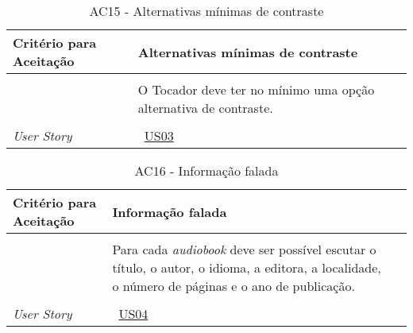 \begin{apendicesenv}
\begin{table}[ht]
\begin{center}
\begin{tabularx}{\textwidth}{|lX|l|}
\end{tabularx}
\end{center}
\label{tab:us01a14}
\end{table}


\begin{table}[ht]
\centering
\caption{AC15 - Alternativas mínimas de contraste}
\vspace{0.1cm}
\begin{center}
\begin{tabularx}{\textwidth}{|lX|l|}

\hline
\textbf{Critério para Aceitação} & Alternativas mínimas de contraste \\
\hline
 & \\
 & O Tocador deve ter no mínimo uma opção alternativa de contraste. \\
 & \\
\hline
\textit{User Story} & ~\hyperref[tab:us03]{US03} \\
\hline

\end{tabularx}
\end{center}
\label{tab:us01a15}
\end{table}


\begin{table}[ht]
\centering
\caption{AC16 - Informação falada}
\vspace{0.1cm}
\begin{center}
\begin{tabularx}{\textwidth}{|lX|l|}

\hline
\textbf{Critério para Aceitação} & Informação falada \\
\hline
 & \\
 & Para cada \textit{audiobook} deve ser possível escutar o título, o autor, o idioma, a editora, a localidade, o número de páginas e o ano de publicação. \\
 & \\
\hline
\textit{User Story} & ~\hyperref[tab:us04]{US04} \\
\hline


\end{tabularx}
\end{center}
\end{table}
\end{apendicesenv}

